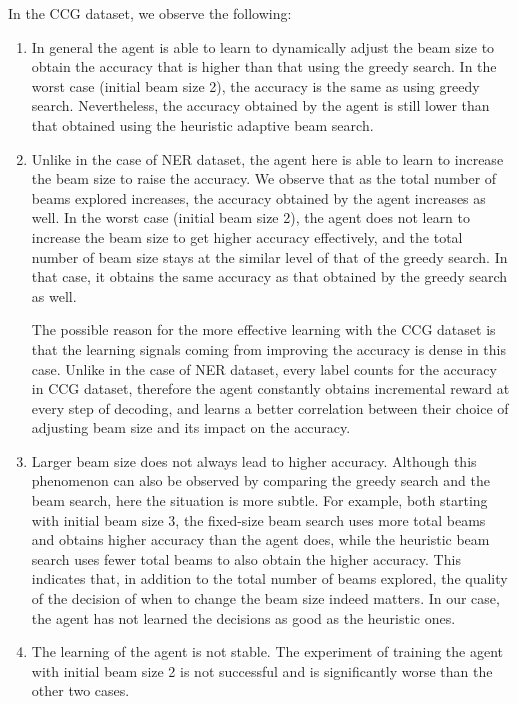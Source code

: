 \documentclass[11pt,a4paper]{article}
\begin{document}
In the CCG dataset, we observe the following:
\begin{enumerate}
\item In general the agent is able to learn to dynamically adjust the beam size to obtain the accuracy that is higher than that using the greedy search. In the worst case (initial beam size 2), the accuracy is the same as using greedy search. Nevertheless, the accuracy obtained by the agent is still lower than that obtained using the heuristic adaptive beam search.
\item Unlike in the case of NER dataset, the agent here is able to learn to increase the beam size to raise the accuracy. We observe that as the total number of beams explored increases, the accuracy obtained by the agent increases as well. In the worst case (initial beam size 2), the agent does not learn to increase the beam size to get higher accuracy effectively, and the total number of beam size stays at the similar level of that of the greedy search. In that case, it obtains the same accuracy as that obtained by the greedy search as well.

The possible reason for the more effective learning with the CCG dataset is that the learning signals coming from improving the accuracy is dense in this case. Unlike in the case of NER dataset, every label counts for the accuracy in CCG dataset, therefore the agent constantly obtains incremental reward at every step of decoding, and learns a better correlation between their choice of adjusting beam size and its impact on the accuracy.

\item Larger beam size does not always lead to higher accuracy. Although this phenomenon can also be observed by comparing the greedy search and the beam search, here the situation is more subtle. For example, both starting with initial beam size 3, the fixed-size beam search uses more total beams and obtains higher accuracy than the agent does, while the heuristic beam search uses fewer total beams to also obtain the higher accuracy. This indicates that, in addition to the total number of beams explored, the quality of the decision of when to change the beam size indeed matters. In our case, the agent has not learned the decisions as good as the heuristic ones. 

\item The learning of the agent is not stable. The experiment of training the agent with initial beam size 2 is not successful and is significantly worse than the other two cases.
\end{enumerate}
\end{document}
